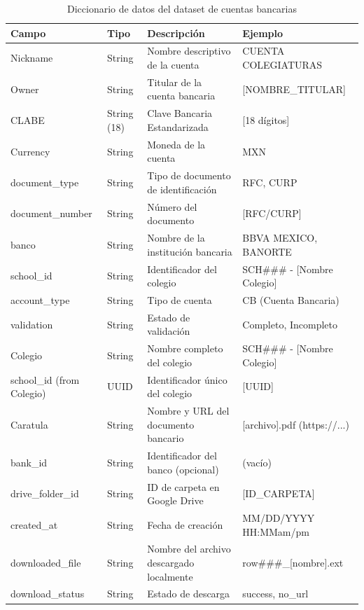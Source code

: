 \begin{table}[htbp]
\centering
\caption{Diccionario de datos del dataset de cuentas bancarias}
\label{tab:diccionario_datos}
\scriptsize
\begin{tabular}{|p{3cm}|p{2cm}|p{5cm}|p{4cm}|}
\hline
\textbf{Campo} & \textbf{Tipo} & \textbf{Descripción} & \textbf{Ejemplo} \\
\hline
Nickname & String & Nombre descriptivo de la cuenta & CUENTA COLEGIATURAS \\
\hline
Owner & String & Titular de la cuenta bancaria & [NOMBRE\_TITULAR] \\
\hline
CLABE & String (18) & Clave Bancaria Estandarizada & [18 dígitos] \\
\hline
Currency & String & Moneda de la cuenta & MXN \\
\hline
document\_type & String & Tipo de documento de identificación & RFC, CURP \\
\hline
document\_number & String & Número del documento & [RFC/CURP] \\
\hline
banco & String & Nombre de la institución bancaria & BBVA MEXICO, BANORTE \\
\hline
school\_id & String & Identificador del colegio & SCH\#\#\# - [Nombre Colegio] \\
\hline
account\_type & String & Tipo de cuenta & CB (Cuenta Bancaria) \\
\hline
validation & String & Estado de validación & Completo, Incompleto \\
\hline
Colegio & String & Nombre completo del colegio & SCH\#\#\# - [Nombre Colegio] \\
\hline
school\_id (from Colegio) & UUID & Identificador único del colegio & [UUID] \\
\hline
Caratula & String & Nombre y URL del documento bancario & [archivo].pdf (https://...) \\
\hline
bank\_id & String & Identificador del banco (opcional) & (vacío) \\
\hline
drive\_folder\_id & String & ID de carpeta en Google Drive & [ID\_CARPETA] \\
\hline
created\_at & String & Fecha de creación & MM/DD/YYYY HH:MMam/pm \\
\hline
downloaded\_file & String & Nombre del archivo descargado localmente & row\#\#\#\_[nombre].ext \\
\hline
download\_status & String & Estado de descarga & success, no\_url \\
\hline
\end{tabular}
\end{table}

